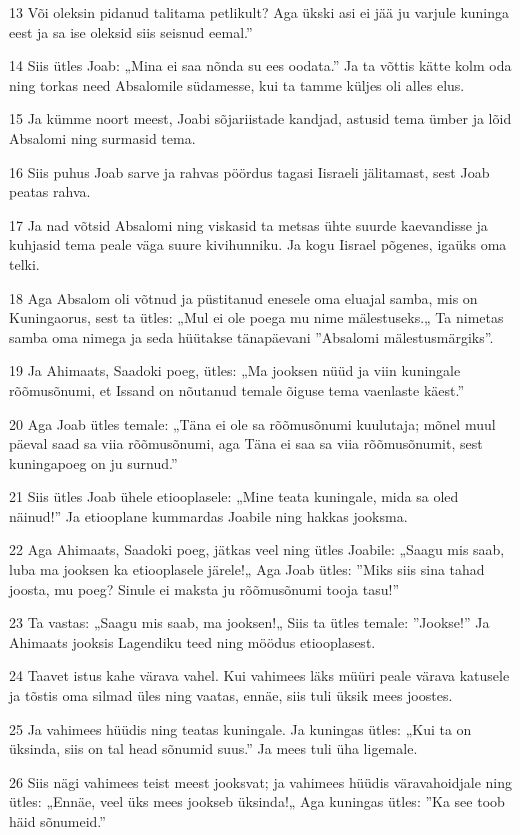 \par 13 Või oleksin pidanud talitama petlikult? Aga ükski asi ei jää ju varjule kuninga eest ja sa ise oleksid siis seisnud eemal.”
\par 14 Siis ütles Joab: „Mina ei saa nõnda su ees oodata.” Ja ta võttis kätte kolm oda ning torkas need Absalomile südamesse, kui ta tamme küljes oli alles elus.
\par 15 Ja kümme noort meest, Joabi sõjariistade kandjad, astusid tema ümber ja lõid Absalomi ning surmasid tema.
\par 16 Siis puhus Joab sarve ja rahvas pöördus tagasi Iisraeli jälitamast, sest Joab peatas rahva.
\par 17 Ja nad võtsid Absalomi ning viskasid ta metsas ühte suurde kaevandisse ja kuhjasid tema peale väga suure kivihunniku. Ja kogu Iisrael põgenes, igaüks oma telki.
\par 18 Aga Absalom oli võtnud ja püstitanud enesele oma eluajal samba, mis on Kuningaorus, sest ta ütles: „Mul ei ole poega mu nime mälestuseks.„ Ta nimetas samba oma nimega ja seda hüütakse tänapäevani ”Absalomi mälestusmärgiks”.
\par 19 Ja Ahimaats, Saadoki poeg, ütles: „Ma jooksen nüüd ja viin kuningale rõõmusõnumi, et Issand on nõutanud temale õiguse tema vaenlaste käest.”
\par 20 Aga Joab ütles temale: „Täna ei ole sa rõõmusõnumi kuulutaja; mõnel muul päeval saad sa viia rõõmusõnumi, aga Täna ei saa sa viia rõõmusõnumit, sest kuningapoeg on ju surnud.”
\par 21 Siis ütles Joab ühele etiooplasele: „Mine teata kuningale, mida sa oled näinud!” Ja etiooplane kummardas Joabile ning hakkas jooksma.
\par 22 Aga Ahimaats, Saadoki poeg, jätkas veel ning ütles Joabile: „Saagu mis saab, luba ma jooksen ka etiooplasele järele!„ Aga Joab ütles: ”Miks siis sina tahad joosta, mu poeg? Sinule ei maksta ju rõõmusõnumi tooja tasu!”
\par 23 Ta vastas: „Saagu mis saab, ma jooksen!„ Siis ta ütles temale: ”Jookse!” Ja Ahimaats jooksis Lagendiku teed ning möödus etiooplasest.
\par 24 Taavet istus kahe värava vahel. Kui vahimees läks müüri peale värava katusele ja tõstis oma silmad üles ning vaatas, ennäe, siis tuli üksik mees joostes.
\par 25 Ja vahimees hüüdis ning teatas kuningale. Ja kuningas ütles: „Kui ta on üksinda, siis on tal head sõnumid suus.” Ja mees tuli üha ligemale.
\par 26 Siis nägi vahimees teist meest jooksvat; ja vahimees hüüdis väravahoidjale ning ütles: „Ennäe, veel üks mees jookseb üksinda!„ Aga kuningas ütles: ”Ka see toob häid sõnumeid.”
